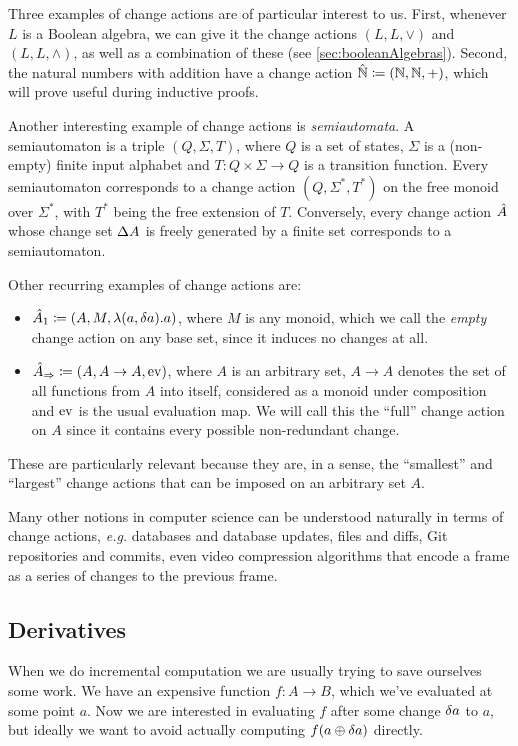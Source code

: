Three examples of change actions are of particular interest to us.
First, whenever
$L$ is a Boolean algebra, we can give it the change actions $(L, L, \vee)$ and $(L, L, \wedge)$, 
as well as a combination of these (see \cref{sec:booleanAlgebras}). Second,
the natural numbers with addition have a change action $\hat{\mathbb{N}} \coloneqq (\mathbb{N},
\mathbb{N}, +)$, which will prove useful during inductive proofs.
 
Another interesting example of change actions is \textit{semiautomata}. A semiautomaton is a triple
$(Q, \Sigma, T)$, where $Q$ is a set of states, $\Sigma$ is a (non-empty) finite input alphabet
and $T : Q \times \Sigma \rightarrow Q$ is a transition function. 
Every semiautomaton corresponds to a change action $(Q, \Sigma^*, T^*)$ on the free monoid
over $\Sigma^*$, with $T^*$ being the free extension of $T$. Conversely, every change action $\hat{A}$
whose change set $\Delta A$ is freely generated by a finite set corresponds to a semiautomaton.

Other recurring examples of change actions are:
\begin{itemize}
  \item $\hat{A}_1 \coloneqq (A,M,\lambda(a, \delta a). a)$, where $M$ is any monoid,
    which we call the \emph{empty} change action on any base set, since it induces no changes at all.
  \item $\hat{A}_\Rightarrow \coloneqq (A,A \rightarrow A,\operatorname{ev})$, where $A$ is an arbitrary
    set, $A \rightarrow A$ denotes the set of all functions from $A$ into itself, considered as
    a monoid under composition and $\operatorname{ev}$ is the usual evaluation map. We will call this the
    ``full'' change action on $A$ since it contains every possible non-redundant change.
\end{itemize}
These are particularly relevant because they are, in a sense, the ``smallest'' and ``largest''
change actions that can be imposed on an arbitrary set $A$.

Many other notions in computer science can be understood naturally in terms of change actions,
\emph{e.g.} databases and database updates, files and diffs, Git repositories and commits, even 
video compression algorithms that encode a frame as a series of changes to the previous frame.

\subsection{Derivatives}

When we do incremental computation we are usually trying to save ourselves some
work. We have an expensive function $f: A \rightarrow B$, which we've evaluated at some point
$a$. Now we are interested in evaluating $f$ after some change $\delta a$ to
$a$, but ideally we want to avoid actually computing $f(a \oplus
\delta a)$ directly.

